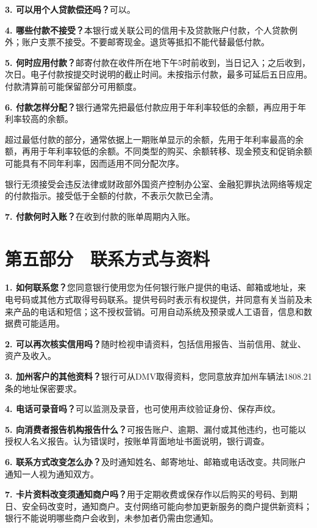 \documentclass[UTF8,fontset=none,11pt,a4paper]{ctexart}
\begin{document}
\textbf{3. 可以用个人贷款偿还吗？}可以。


\textbf{4. 哪些付款不接受？}本银行或关联公司的信用卡及贷款账户付款，个人贷款例外；账户支票不接受。不要邮寄现金。退货等抵扣不能代替\allowbreak\mbox{最低付款。}


\textbf{5. 何时应用付款？}邮寄付款在收件所在地下午5时前收到，当日记入；之后收到，次日。电子付款按提交时说明的截止时间。未按指示付款，最多可延后五日应用。付款清算前可能保留部分\allowbreak\mbox{可用额度。}


\textbf{6. 付款怎样分配？}银行通常先把最低付款应用于年利率较低的余额，再应用于年利率较\allowbreak\mbox{高的余额。}


超过最低付款的部分，通常依据上一期账单显示的余额，先用于年利率最高的余额，再用于年利率较低的余额。不同类型的购买、余额转移、现金预支和促销余额可能具有不同年利率，因而适用不同\allowbreak\mbox{分配次序。}


银行无须接受会违反法律或财政部外国资产控制办公室、金融犯罪执法网络等规定的付款指示。接受低于全额的付款，不表示欠\allowbreak\mbox{款已全清。}


\textbf{7. 付款何时入账？}在收到付款的账单周\allowbreak\mbox{期内入账。}


\section*{第五部分　联系方式与资料}
\textbf{1. 如何联系您？}您同意银行使用您为任何银行账户提供的电话、邮箱或地址，来电号码或其他方式取得号码联系。提供号码时表示有权提供，并同意有关当前及未来产品的电话和短信；这不授权营销。可用自动系统及预录或人工语音，信息和数据费\allowbreak\mbox{可能适用。}


\textbf{2. 可以再次核实信用吗？}随时检视申请资料，包括信用报告、当前信用、就业、资\allowbreak\mbox{产及收入。}


\textbf{3. 加州客户的其他资料？}银行可从DMV取得资料，您同意放弃加州车辆法1808.21条的地址\allowbreak\mbox{保密要求。}


\textbf{4. 电话可录音吗？}可以监测及录音，也可使用声纹验证身份、\allowbreak\mbox{保存声纹。}


\textbf{5. 向消费者报告机构报告什么？}可报告账户、逾期、漏付或其他违约，也可能以授权人名义报告。认为错误时，按账单背面地址书面说明，\allowbreak\mbox{银行调查。}


\textbf{6. 联系方式改变怎么办？}及时通知姓名、邮寄地址、邮箱或电话改变。共同账户通知一人视为\allowbreak\mbox{通知双方。}


\textbf{7. 卡片资料改变须通知商户吗？}用于定期收费或保存作以后购买的号码、到期日、安全码改变时，通知商户。支付网络可能向参加更新服务的商户提供新资料；银行不能说明哪些商户会收到，未参加者仍需\allowbreak\mbox{由您通知。}
\end{document}
